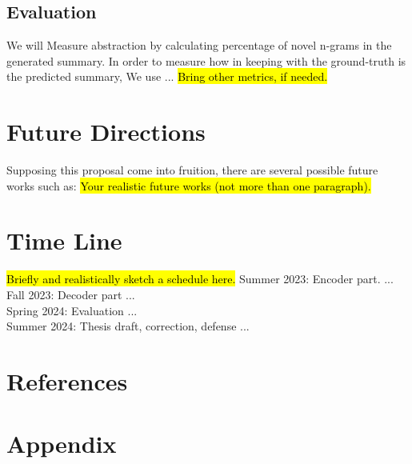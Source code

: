 \documentclass[12pt,onecolumn,a4paper]{article}
\begin{document}
\subsection{Evaluation}

We will Measure abstraction by calculating percentage of novel n-grams in the generated summary. In order to measure how in keeping with the ground-truth is the predicted summary, We use ... \hl{Bring other metrics, if needed.}


\section{Future Directions}
Supposing this proposal come into fruition, there are several possible future works such as: \hl{Your realistic future works (not more than one paragraph).}


\section{Time Line}
\hl{Briefly and realistically sketch a schedule here.}
Summer 2023: Encoder part. ... \\
Fall 2023: Decoder part ... \\
Spring 2024: Evaluation ... \\
Summer 2024: Thesis draft, correction, defense ...
\newpage
\section{References}
\vspace*{-\baselineskip}
\setlength{\bibsep}{2pt}
\renewcommand*{\bibfont}{\scriptsize}
\renewcommand{\refname}{}

%
%

\newpage

\section{Appendix}
\appendix
\end{document}
